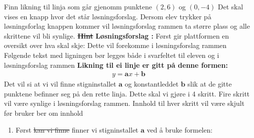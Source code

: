 \documentclass[12pt,twoside,onecolumn]{article}
\begin{document}
\begin{Exercise}
\hspace{-6.5mm}Finn likning til linja som går gjenomm punktene $(2,6)$  og  $(0,-4)$
\newline\newline
{\color{Maroon} Det skal vises en knapp hvor det står løsningsforslag. Dersom elev trykker på løsningsforlag knappen kommer vil løsningsforslag rammen ta større plass og alle skrittene vil bli synlige.} 
\newline
\newline
\newline
\st{\textbf{Hint }}
\newline
\textbf{Løsningsforslag :}
\newline
{\color{Maroon}Først gir plattformen en oversikt over hva skal skje: Dette vil forekomme i løsningsforslag rammen} 
\newline
{\color{Cerulean} Følgende tekst med ligningen bør legges både i svarfeltet til eleven og i løsningsforslag rammen}
\newline
\textbf{Likning til ei linje er gitt på denne formen:}
\begin{align}
y=\mathbf{a}x + \mathbf{b}
\end{align}
Det vil si at vi vil finne stigninstallet $\mathbf{a}$ og konstantleddet $\mathbf{b}$ slik at de gitte punktene befinner seg på den rette linja. Dette skal vi gjøre i 4 skritt.
\newline
\newline
{\color{Cerulean} Fire skritt vil være synlige i løsningsforslag rammen. Innhold til hver skritt vil være skjult før bruker ber om innhold}
\newline
\begin{enumerate}
\item Først \st{kan vi finne} finner vi stigninstallet $\mathbf{a}$  ved å bruke formelen:


\end{enumerate}
\end{Exercise}
\end{document}
